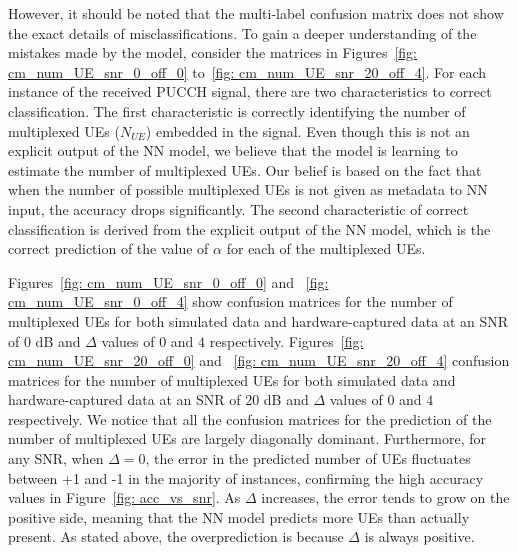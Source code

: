 \documentclass[journal]{IEEEtran}
\begin{document}
However, it should be noted that the multi-label confusion matrix does not show the exact details of misclassifications. To gain a deeper understanding of the mistakes made by the model, consider the matrices in Figures~\ref{fig: cm_num_UE_snr_0_off_0} to~\ref{fig: cm_num_UE_snr_20_off_4}. For each instance of the received PUCCH signal, there are two characteristics to correct classification. The first characteristic is correctly identifying the number of multiplexed UEs ($N_{UE}$) embedded in the signal. Even though this is not an explicit output of the NN model, we believe that the model is learning to estimate the number of multiplexed UEs. Our belief is based on the fact that when the number of possible multiplexed UEs is not given as metadata to NN input, the accuracy drops significantly. The second characteristic of correct classification is derived from the explicit output of the NN model, which is the correct prediction of the value of $\alpha$ for each of the multiplexed UEs. 

Figures~\ref{fig: cm_num_UE_snr_0_off_0} and ~\ref{fig: cm_num_UE_snr_0_off_4} show confusion matrices for the number of multiplexed UEs for both simulated data and hardware-captured data at an SNR of $0$ dB and $\Delta$ values of $0$ and $4$ respectively. Figures~\ref{fig: cm_num_UE_snr_20_off_0} and ~\ref{fig: cm_num_UE_snr_20_off_4} confusion matrices for the number of multiplexed UEs for both simulated data and hardware-captured data at an SNR of $20$ dB and $\Delta$ values of $0$ and $4$ respectively. We notice that all the confusion matrices for the prediction of the number of multiplexed UEs are largely diagonally dominant. Furthermore, for any SNR, when $\Delta = 0$, the error in the predicted number of UEs fluctuates between +1 and -1 in the majority of instances, confirming the high accuracy values in Figure~\ref{fig: acc_vs_snr}. As $\Delta$ increases,  the error tends to grow on the positive side, meaning that the NN model predicts more UEs than actually present. As stated above, the overprediction is because $\Delta$ is always positive. 
\end{document}
